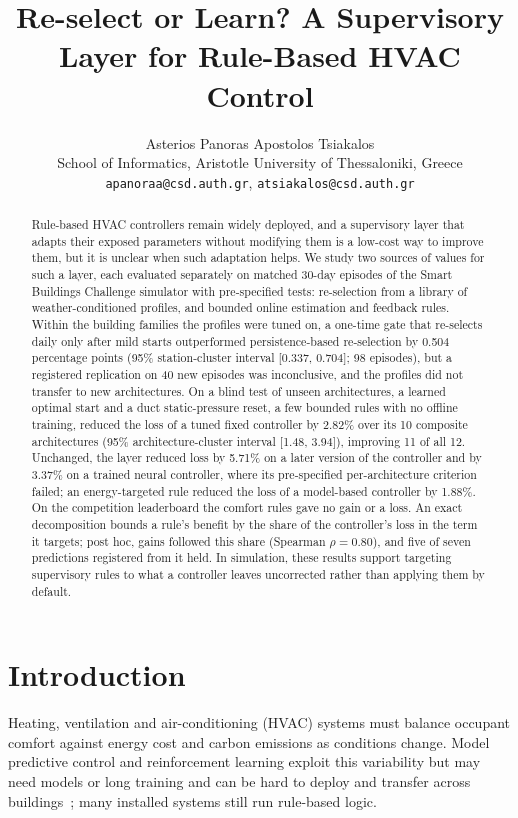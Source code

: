 \documentclass{article}
\title{Re-select or Learn? A Supervisory Layer for Rule-Based HVAC Control}
\author{%
  Asterios Panoras \qquad Apostolos Tsiakalos\\
  School of Informatics, Aristotle University of Thessaloniki, Greece\\
  \texttt{apanoraa@csd.auth.gr}, \texttt{atsiakalos@csd.auth.gr}
}
\date{}
\begin{document}
\maketitle

\begin{abstract}
Rule-based HVAC controllers remain widely deployed, and a supervisory layer that adapts their exposed
parameters without modifying them is a low-cost way to improve them, but it is unclear when such adaptation
helps. We study two sources of values for such a layer, each evaluated separately on matched 30-day episodes
of the Smart Buildings Challenge simulator with pre-specified tests: re-selection from a library of
weather-conditioned profiles, and bounded online estimation and feedback rules. Within the building families
the profiles were tuned on, a one-time gate that re-selects daily only after mild starts outperformed
persistence-based re-selection by 0.504 percentage points (95\% station-cluster interval [0.337, 0.704]; 98
episodes), but a registered replication on 40 new episodes was inconclusive, and the profiles did not transfer
to new architectures. On a blind test of unseen architectures, a learned optimal start and a duct
static-pressure reset, a few bounded rules with no offline training, reduced the loss of a tuned fixed
controller by 2.82\% over its 10 composite architectures (95\% architecture-cluster interval [1.48, 3.94]), improving 11 of all 12.
Unchanged, the layer reduced loss by 5.71\% on a later version of the controller and by 3.37\% on a trained
neural controller, where its pre-specified per-architecture criterion failed; an energy-targeted rule reduced
the loss of a model-based controller by 1.88\%. On the competition leaderboard the comfort rules gave no gain
or a loss. An exact decomposition bounds a rule's benefit by the share of the controller's loss in the term it
targets; post hoc, gains followed this share (Spearman $\rho = 0.80$), and five of seven predictions
registered from it held. In simulation, these results support targeting supervisory rules to what a controller
leaves uncorrected rather than applying them by default.
\end{abstract}

\section{Introduction}
Heating, ventilation and air-conditioning (HVAC) systems must balance occupant comfort against energy cost and carbon
emissions as conditions change. Model predictive control and reinforcement learning exploit this variability but
may need models or long training and can be hard to deploy and transfer across buildings~\cite{drgona2020mpc,wang2020rl};
many installed systems still run rule-based logic.
\end{document}
